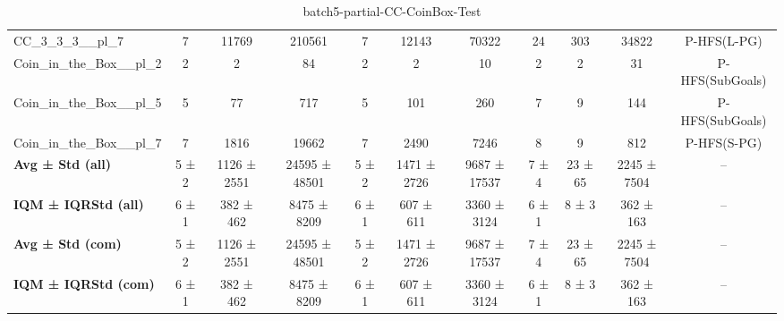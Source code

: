 \begin{table}[!ht]
\begin{tabular}{l|ccc|ccc|cccc}
CC\_3\_3\_3\_\_pl\_7 & 7 & 11769 & 210561 & 7 & 12143 & 70322 & 24 & 303 & 34822 & P-HFS(L-PG) \\
Coin\_in\_the\_Box\_\_pl\_2 & 2 & 2 & 84 & 2 & 2 & 10 & 2 & 2 & 31 & P-HFS(SubGoals) \\
Coin\_in\_the\_Box\_\_pl\_5 & 5 & 77 & 717 & 5 & 101 & 260 & 7 & 9 & 144 & P-HFS(SubGoals) \\
Coin\_in\_the\_Box\_\_pl\_7 & 7 & 1816 & 19662 & 7 & 2490 & 7246 & 8 & 9 & 812 & P-HFS(S-PG) \\
\hline
\textbf{Avg ± Std (all)} & 5 ± 2 & 1126 ± 2551 & 24595 ± 48501 & 5 ± 2 & 1471 ± 2726 & 9687 ± 17537 & 7 ± 4 & 23 ± 65 & 2245 ± 7504 & -- \\
\textbf{IQM ± IQRStd (all)} & 6 ± 1 & 382 ± 462 & 8475 ± 8209 & 6 ± 1 & 607 ± 611 & 3360 ± 3124 & 6 ± 1 & 8 ± 3 & 362 ± 163 & -- \\
\textbf{Avg ± Std (com)} & 5 ± 2 & 1126 ± 2551 & 24595 ± 48501 & 5 ± 2 & 1471 ± 2726 & 9687 ± 17537 & 7 ± 4 & 23 ± 65 & 2245 ± 7504 & -- \\
\textbf{IQM ± IQRStd (com)} & 6 ± 1 & 382 ± 462 & 8475 ± 8209 & 6 ± 1 & 607 ± 611 & 3360 ± 3124 & 6 ± 1 & 8 ± 3 & 362 ± 163 & -- \\
\end{tabular}
\caption{batch5-partial-CC-CoinBox-Test}
\label{tab:batch5_partial_CC-CoinBox_comparison_test}
\end{table}
